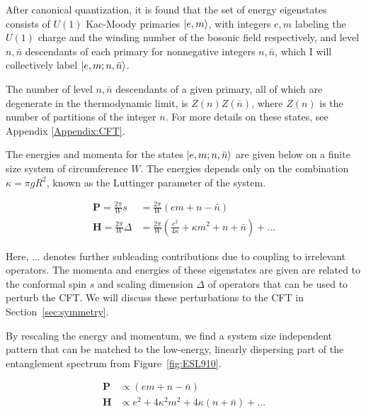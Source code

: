 

After canonical quantization, it is found that the set of energy
eigenstates consists of $U(1)$ Kac-Moody primaries $\vert e, m \rangle$, with
integers $e, m$ labeling the $U(1)$ charge and the winding number of
the bosonic field respectively, and level $n, \bar{n}$ descendants of each primary for
nonnegative integers $n,\bar{n}$,
which I will collectively label $\vert e, m; n, \bar{n} \rangle$.

The number of level $n, \bar{n}$ descendants of a given
primary, all of which are degenerate in the thermodynamic limit, is $Z(n) Z(\bar{n})$, where
$Z(n)$ is the number of partitions of the integer $n$.
For more details on these states, see Appendix \ref{Appendix:CFT}.

The energies and momenta for the states $\vert e, m; n, \bar{n} \rangle$ are given below
on a finite size system of circumference $W$.
The energies depends only on the combination $\kappa = \pi g R^2$,
known as the Luttinger parameter of the system. \cite{giamarchi}

\begin{align}
	\mathbf{P} =\frac{2\pi}{W} s
	&= \frac{2\pi}{W}(em + n - \bar{n}) \\
	\mathbf{H} = \frac{2\pi}{W}\Delta
	&= \frac{2\pi}{W}(\frac{e^2}{4\kappa} + \kappa m^2 + n + \bar{n}) + \ldots %
\end{align}

Here, $\ldots$ denotes further subleading contributions due to coupling to irrelevant operators.
The momenta and energies of these eigenstates are given are related to the conformal
spin $s$ and scaling dimension $\Delta$ of operators that can be used to perturb the CFT.
We will discuss these perturbations to the CFT in Section~\ref{sec:symmetry}.

By rescaling the energy and momentum, we find a system size
independent pattern that can be matched to the low-energy, linearly
dispersing part of the entanglement spectrum from Figure~\ref{fig:ESL910}.

\begin{align}
\mathbf{P} &\propto (em + n - \bar{n}) \\
\mathbf{H} &\propto e^2 + 4\kappa^2 m^2 + 4\kappa(n + \bar{n}) + \ldots
\end{align}


